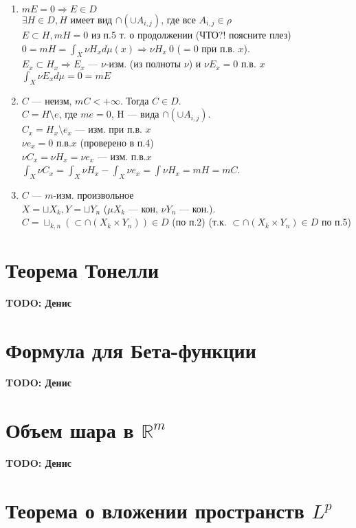 \documentclass[paper=a4, fontsize=13.2pt]{article}
\begin{document}
\begin{enumerate}
			\item
				$m E = 0 \Rightarrow E \in D$\\
				$\exists H \in D, H$ имеет вид $\cap(\cup A_{i, j})$, где все $A_{i,j} \in \rho$ \\
				$E \subset H , m H = 0$ из п.5 т. о продолжении (ЧТО?! поясните плез)\\
				$0 = m H = \int_X\nu H_x d\mu(x) \Rightarrow \nu H_x ~ 0$ ($ = 0$ при п.в. $x$).\\
				$E_x \subset H_x \Rightarrow E_x$ --- $\nu$-изм. (из полноты $\nu$) и $\nu E_x = 0$ п.в. $x$\\
				$\int_X \nu E_x d\mu = 0 = m E$
			\item
				$C$ --- неизм, $m C < +\infty$. Тогда $C \in D$.\\
				$C = H \setminus e$, где $m e = 0$, H --- вида $\cap(\cup A_{i, j})$.\\
				$C_x = H_x \setminus e_x$ --- изм. при п.в. $x$\\
				$\nu e_x = 0$ п.в.$x$ (проверено в п.4)\\
				$\nu C_x = \nu H_x = \nu e_x$ --- изм. п.в.$x$\\
				$\int_X\nu C_x = \int_X\nu H_x - \int_X\nu e_x = \int\nu H_x = m H = m C$.
			\item
				$C$ --- $m$-изм. произвольное\\
				$X = \sqcup X_k, Y = \sqcup Y_n$ ($\mu X_k$ --- кон, $\nu Y_n$ --- кон.).\\
				$C = \sqcup_{k,n}(\subset \cap(X_k \times Y_n)) \in D$ (по п.2) (т.к. $\subset \cap(X_k \times Y_n) \in D$ по п.5)
		\end{enumerate}
	

\section{Теорема Тонелли}
\textbf{TODO: Денис}
\section{Формула для Бета-функции}
\textbf{TODO: Денис}
\section{Объем шара в $\mathbb R^m$}
\textbf{TODO: Денис}
\section{Теорема о вложении пространств $L^p$}
\end{document}
